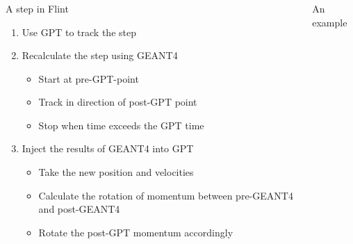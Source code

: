 \documentclass{beamer}
\newcommand{\ident}{\thesection.\thesubsection}
\newcommand{\ftitle}{\frametitle{\nameref{\ident}}}
\newcommand{\geant}{G{\smaller EANT}4 }
\begin{document}
\begin{frame}
	\ftitle
	\begin{columns}
		\begin{column}{7.5cm}
			\begin{block}{A step in Flint}
				\begin{enumerate}[<alert@+>]
					\item Use GPT to track the step
					\item Recalculate the step using \geant\\
						\begin{itemize}
							\item Start at pre-GPT-point
							\item Track in direction of post-GPT point
							\item Stop when time exceeds the GPT time
						\end{itemize}
					\item Inject the results of \geant into GPT\\
						\begin{itemize}
							\item Take the new position and velocities
							\item Calculate the rotation of momentum between pre-\geant and post-\geant
							\item Rotate the post-GPT momentum accordingly
						\end{itemize}
				\end{enumerate}
			\end{block}
		\end{column}
		\begin{column}{3.5cm}
			\begin{exampleblock}{An example}
				\begin{figure}

\end{figure}
\end{exampleblock}
\end{column}
\end{columns}
\end{frame}
\end{document}
